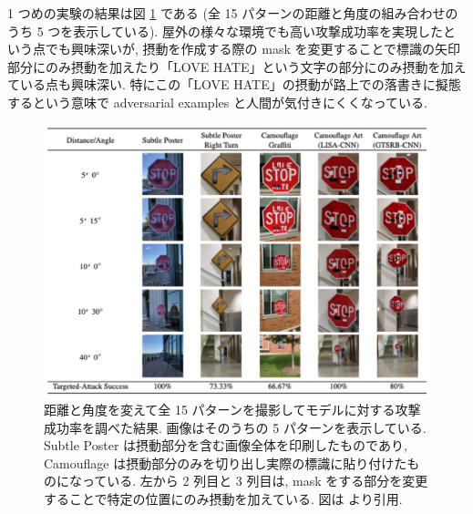 1 つめの実験の結果は図 \ref{fig:robust-physical-result-image} である (全 15 パターンの距離と角度の組み合わせのうち 5 つを表示している).
屋外の様々な環境でも高い攻撃成功率を実現したという点でも興味深いが, 摂動を作成する際の mask を変更することで標識の矢印部分にのみ摂動を加えたり「LOVE HATE」という文字の部分にのみ摂動を加えている点も興味深い.
特にこの「LOVE HATE」の摂動が路上での落書きに擬態するという意味で adversarial examples と人間が気付きにくくなっている.
%
\begin{figure}[htbp]
\begin{center}
\includegraphics[width=14.0cm]{figures/robust-physical-result-image.pdf}
\end{center}
\caption{
距離と角度を変えて全 15 パターンを撮影してモデルに対する攻撃成功率を調べた結果.
画像はそのうちの 5 パターンを表示している.
Subtle Poster は摂動部分を含む画像全体を印刷したものであり, Camouflage は摂動部分のみを切り出し実際の標識に貼り付けたものになっている.
左から 2 列目と 3 列目は, mask をする部分を変更することで特定の位置にのみ摂動を加えている.
図は \cite{eykholt2018robust} より引用.
}
\label{fig:robust-physical-result-image}
\end{figure}
%

